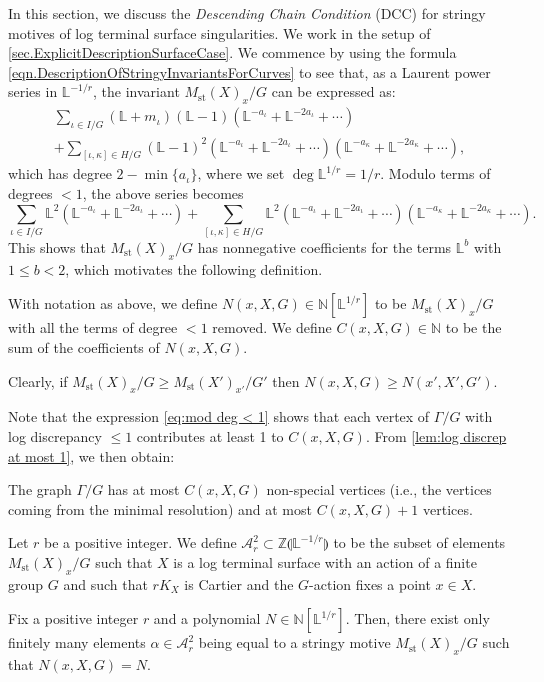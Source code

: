 \documentclass[12pt]{amsart}
\theoremstyle{plain}   %
\theoremstyle{definition}    %
\theoremstyle{remark}    %
\numberwithin{equation}{theorem}
\DeclareMathOperator{\st}{\mathrm{st}}
\newcommand{\sA}{\mathcal{A}}
\newcommand{\bL}{\mathbb{L}}
\newcommand{\bN}{\mathbb{N}}
\newcommand{\bZ}{\mathbb{Z}}
\begin{document}
In this section, we discuss the \emph{Descending Chain Condition} (DCC) for stringy motives of log terminal surface singularities. We work in the setup of \autoref{sec.ExplicitDescriptionSurfaceCase}. We commence by using the formula \autoref{eqn.DescriptionOfStringyInvariantsForCurves} to see that, as a Laurent power series in $\bL^{-1/r}$, the invariant $M_{\st}(X)_x/G$ can be expressed as: 
\begin{multline*}
\sum_{\iota \in I/G}(\bL+m_{\iota})(\bL-1)(\bL^{-a_{\iota}}+\bL^{-2a_{\iota}}+\cdots)\\
+\sum_{ [\iota,\kappa] \in H/G }(\bL-1)^{2}(\bL^{-a_{\iota}}+\bL^{-2a_{\iota}}+\cdots)(\bL^{-a_{\kappa}}+\bL^{-2a_{\kappa}}+\cdots),
\end{multline*}
which has degree $2-\min\{a_{\iota}\}$, where we set $\deg\bL^{1/r}=1/r$. Modulo terms of degrees $<1$, the above series becomes
\begin{equation}
\sum_{\iota \in I/G}\bL^{2}(\bL^{-a_{\iota}}+\bL^{-2a_{\iota}}+\cdots)+\sum_{[\iota,\kappa] \in H/G}\bL^{2}(\bL^{-a_{\iota}}+\bL^{-2a_{\iota}}+\cdots)(\bL^{-a_{\kappa}}+\bL^{-2a_{\kappa}}+\cdots).\label{eq:mod deg < 1}
\end{equation}
This shows that $M_{\st}(X)_x/G$ has nonnegative coefficients for the terms $\bL^{b}$ with $1\le b<2$, which motivates the following definition.
\begin{definition}
With notation as above, we define $N(x,X,G)\in\bN[\bL^{1/r}]$ to be $M_{\st}(X)_x/G$ with all the terms of degree $<1$ removed. We define $C(x,X,G)\in\bN$ to be the sum of the coefficients of $N(x,X,G)$. 
\end{definition}

\begin{remark} \label{rem.Monotonicity}
Clearly, if $M_{\st}(X)_x/G \geq M_{\st}(X')_{x'}/G'$ then $N(x,X,G)\ge N(x',X',G')$. 
\end{remark}

Note that the expression \autoref{eq:mod deg < 1} shows that each vertex of $\Gamma/G$ with log discrepancy $\le 1$ contributes at least 1 to $C(x,X,G)$. From \autoref{lem:log discrep at most 1}, we then obtain:

\begin{lemma} \label{lem.BoundingVertices}
The graph $\Gamma/G$ has at most $C(x,X,G)$ non-special vertices (i.e., the vertices coming from the minimal resolution) and
at most $C(x,X,G)+1$ vertices.
\end{lemma}

\begin{definition}Let $r$ be a positive integer. We define $\sA_r^2 \subset \bZ \llparenthesis \bL^{-1/r} \rrparenthesis$ to be the subset of elements $M_{\st}(X)_x/G$ such that $X$ is a log terminal surface with an action of a finite group $G$ and such that $rK_X$ is Cartier and the $G$-action fixes a point $x\in X$.
\end{definition}
\begin{lemma}
\label{lem:bounded C(X,G)} Fix a positive integer $r$ and a polynomial $N \in \bN[\bL^{1/r}]$. Then, there exist only finitely many elements $\alpha \in \sA_r^2$ being equal to a stringy motive $M_{\st}(X)_x/G$ such that $N(x,X,G)=N$. 
\end{lemma}
\end{document}
